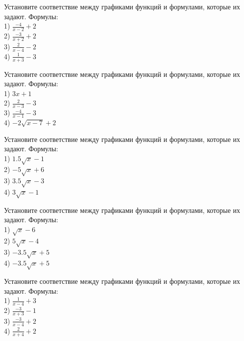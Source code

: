 \documentclass[4apaper]{article}
\begin{document}
\begin{taskBN}{38}
Установите соответствие между графиками функций и формулами, которые их задают. Формулы: \\1) $\frac{-4}{x-2}+2$\\2) $\frac{-3}{x+2}+2$\\3) $\frac{2}{x-4}-2$\\4) $\frac{1}{x+3}-3$
\end{taskBN}

\begin{taskBN}{39}
Установите соответствие между графиками функций и формулами, которые их задают. Формулы: \\1) $3x+1$\\2) $\frac{2}{x-3}-3$\\3) $\frac{-4}{x-1}-3$\\4) $-2\sqrt{x-7}+2$
\end{taskBN}

\begin{taskBN}{40}
Установите соответствие между графиками функций и формулами, которые их задают. Формулы: \\1) $1.5\sqrt{x}-1$\\2) $-5\sqrt{x}+6$\\3) $3.5\sqrt{x}-3$\\4) $3\sqrt{x}-1$
\end{taskBN}

\begin{taskBN}{41}
Установите соответствие между графиками функций и формулами, которые их задают. Формулы: \\1) $\sqrt{x}-6$\\2) $5\sqrt{x}-4$\\3) $-3.5\sqrt{x}+5$\\4) $-3.5\sqrt{x}+5$
\end{taskBN}

\begin{taskBN}{42}
Установите соответствие между графиками функций и формулами, которые их задают. Формулы: \\1) $\frac{1}{x-4}+3$\\2) $\frac{-3}{x+3}-1$\\3) $\frac{-3}{x-4}+2$\\4) $\frac{2}{x+4}+2$
\end{taskBN}
\end{document}
